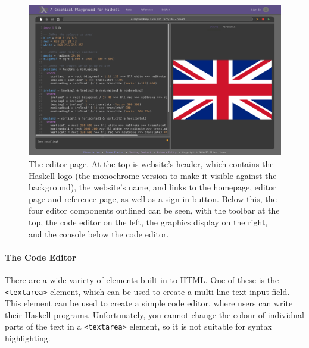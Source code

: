 \documentclass[../main.tex]{subfiles}
\begin{document}
                \begin{figure}[H]
                    \centering
                    \includegraphics[width=0.9\linewidth]{images/editor.png}
                        \caption{The editor page.
                            At the top is website's header, which contains the Haskell logo (the monochrome
                                version to make it visible against the background), the website's name, and
                                links to the homepage, editor page and reference page, as well as a sign in
                                button.
                            Below this, the four editor components outlined can be seen, with the toolbar
                                at the top, the code editor on the left, the graphics display on the right, and
                                the console below the code editor.
                        }
                        \label{fig:editor}
                \end{figure}

                \paragraph{The Code Editor}
                    There are a wide variety of elements built-in to HTML.
                    One of these is the \texttt{<textarea>} element, which can be used to create a
                        multi-line text input field.
                    This element can be used to create a simple code editor, where users can write
                        their Haskell programs.
                    Unfortunately, you cannot change the colour of individual parts of the text in
                        a \texttt{<textarea>} element, so it is not suitable for syntax highlighting.
\end{document}
